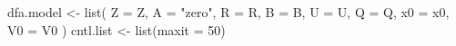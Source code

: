 \begin{Schunk}
\begin{Sinput}
 dfa.model <- list(
   Z = Z, A = "zero", R = R, B = B, U = U,
   Q = Q, x0 = x0, V0 = V0
 )
 cntl.list <- list(maxit = 50)
\end{Sinput}
\end{Schunk}
